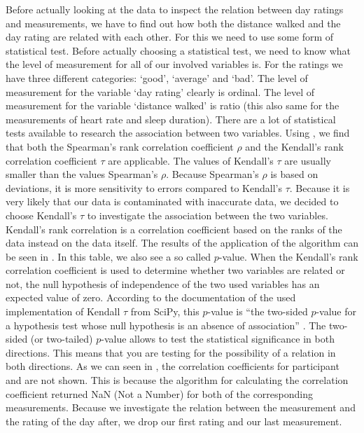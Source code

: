 Before actually looking at the data to inspect the relation between day ratings and measurements, we have to find out how both the distance walked and the day rating are related with each other.
For this we need to use some form of statistical test.
Before actually choosing a statistical test, we need to know what the level of measurement for all of our involved variables is.
For the ratings we have three different categories: `good', `average' and `bad'.
The level of measurement for the variable `day rating' clearly is ordinal.
The level of measurement for the variable `distance walked' is ratio (this also same for the measurements of heart rate and sleep duration).
There are a lot of statistical tests available to research the association between two variables. 
Using \cite{nayak2011choose}, we find that both the Spearman's rank correlation coefficient $\rho$ and the Kendall's rank correlation coefficient $\tau$ are applicable.
The values of Kendall's $\tau$ are usually smaller than the values Spearman's $\rho$. 
Because Spearman's $\rho$ is based on deviations, it is more sensitivity to errors compared to Kendall's $\tau$.
Because it is very likely that our data is contaminated with inaccurate data, we decided to choose Kendall's $\tau$ to investigate the association between the two variables.
Kendall's rank correlation is a correlation coefficient based on the ranks of the data instead on the data itself. 
The results of the application of the algorithm can be seen in .
In this table, we also see a so called $p$-value.
When the Kendall's rank correlation coefficient is used to determine whether two variables are related or not, the null hypothesis of independence of the two used variables has an expected value of zero.
According to the documentation of the used implementation of Kendall $\tau$ from SciPy, this $p$-value is ``the two-sided $p$-value for a hypothesis test whose null hypothesis is an absence of association'' \cite{kendalltauscipy}.
The two-sided (or two-tailed) $p$-value allows to test the statistical significance in both directions. 
This means that you are testing for the possibility of a relation in both directions.
As we can seen in , the correlation coefficients for participant  and  are not shown. 
This is because the algorithm for calculating the correlation coefficient returned NaN (Not a Number) for both of the corresponding measurements. 
Because we investigate the relation between the measurement and the rating of the day after, we drop our first rating and our last measurement.
